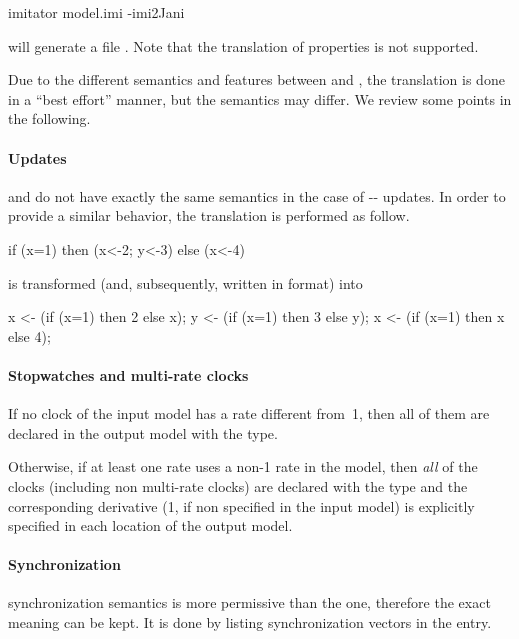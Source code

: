 \begin{terminal}
imitator model.imi -imi2Jani
\end{terminal}

\imitator{} will generate a file .
Note that the translation of properties is not supported.

Due to the different semantics and features between \imitator{} and \jani{}, the translation is done in a ``best effort'' manner, but the semantics may differ.
We review some points in the following.

\paragraph{Updates}
\imitator{} and \jani{} do not have exactly the same semantics in the case of -- updates.
In order to provide a similar behavior, the translation is performed as follow.

\begin{IMITATORmodel}
if (x=1) then (x<-2; y<-3) else (x<-4)
\end{IMITATORmodel}

\noindent{}is transformed (and, subsequently, written in \jani{} format) into

\begin{IMITATORmodel}
x <- (if (x=1) then 2 else x);
y <- (if (x=1) then 3 else y);
x <- (if (x=1) then x else 4);
\end{IMITATORmodel}


\paragraph{Stopwatches and multi-rate clocks}
If no clock of the input model has a rate different from~1, then all of them are declared in the output \jani{} model with the  type.

Otherwise, if at least one rate uses a non-1 rate in the \imitator{} model, then \emph{all} of the clocks (including non multi-rate clocks) are declared with the  type and the corresponding derivative (1, if non specified in the \imitator{} input model) is explicitly specified in each location of the output model.

\paragraph{Synchronization}
\jani{} synchronization semantics is more permissive than the \imitator{} one, therefore the exact meaning can be kept.
It is done by listing synchronization vectors in the  entry.

